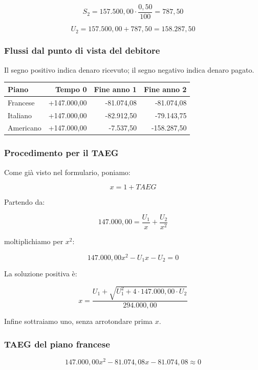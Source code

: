 \[
    S_2=157.500{,}00\cdot\frac{0{,}50}{100}=787{,}50
\]

\[
    U_2=157.500{,}00+787{,}50=158.287{,}50
\]

\subsubsection*{Flussi dal punto di vista del debitore}

Il segno positivo indica denaro ricevuto;
il segno negativo indica denaro pagato.

\begin{center}
    \begin{tabular}{lrrr}
        \hline
        Piano & Tempo 0 & Fine anno 1 & Fine anno 2 \\
        \hline
        Francese & +147.000,00 & -81.074,08 & -81.074,08 \\
        Italiano & +147.000,00 & -82.912,50 & -79.143,75 \\
        Americano & +147.000,00 & -7.537,50 & -158.287,50 \\
        \hline
    \end{tabular}
\end{center}

\subsubsection*{Procedimento per il TAEG}

\noindent Come già visto nel formulario, poniamo:

\[
    x=1+TAEG
\]

\noindent Partendo da:

\[
    147.000{,}00=\frac{U_1}{x}+\frac{U_2}{x^2}
\]

\noindent moltiplichiamo per $x^2$:

\[
    147.000{,}00x^2-U_1x-U_2=0
\]

\noindent La soluzione positiva è:

\[
    x=
    \frac{
        U_1+\sqrt{U_1^2+4\cdot147.000{,}00\cdot U_2}
    }{294.000{,}00}
\]

\noindent  Infine sottraiamo uno, senza arrotondare prima $x$.

\subsubsection*{TAEG del piano francese}

\[
    147.000{,}00x^2
    -81.074{,}08x
    -81.074{,}08
    \approx0
\]

